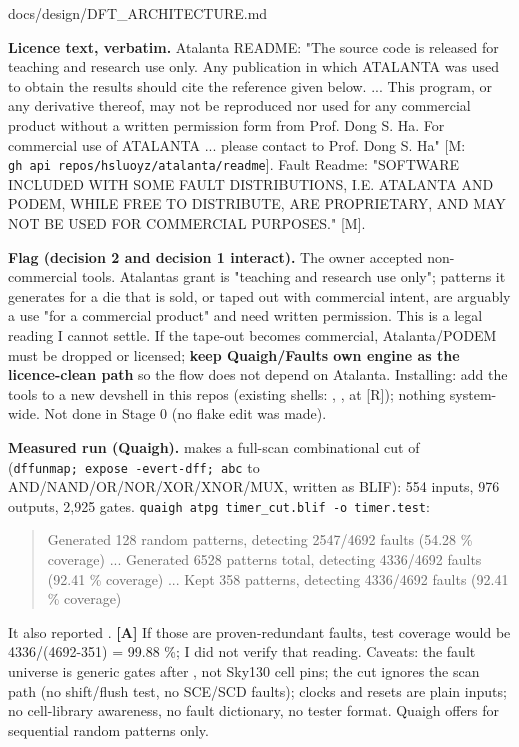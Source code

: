 \begin{relocated}{docs/design/DFT_ARCHITECTURE.md}
{}

\textbf{Licence text, verbatim.} Atalanta README: "The source code is
released for teaching and research use only. Any publication in which
ATALANTA was used to obtain the results should cite the reference given
below. ... This program, or any derivative thereof, may not be
reproduced nor used for any commercial product without a written
permission form from Prof. Dong S. Ha. For commercial use of ATALANTA
... please contact to Prof. Dong S. Ha" {[}M:
\texttt{gh\ api\ repos/\allowbreak{}hsluoyz/\allowbreak{}atalanta/\allowbreak{}readme}{]}.
Fault Readme: "SOFTWARE INCLUDED WITH SOME FAULT DISTRIBUTIONS, I.E.
ATALANTA AND PODEM, WHILE FREE TO DISTRIBUTE, ARE PROPRIETARY, AND MAY
NOT BE USED FOR COMMERCIAL PURPOSES." {[}M{]}.

\textbf{Flag (decision 2 and decision 1 interact).} The owner accepted
non-commercial tools. Atalanta\textquotesingle s grant is "teaching and
research use only"; patterns it generates for a die that is sold, or
taped out with commercial intent, are arguably a use "for a commercial
product" and need written permission. This is a legal reading I cannot
settle. If the tape-out becomes commercial, Atalanta/\allowbreak{}PODEM
must be dropped or licensed; \textbf{keep
Quaigh/\allowbreak{}Fault\textquotesingle s own engine as the
licence-clean path} so the flow does not depend on Atalanta. Installing:
add the tools to a new devshell in this repo\textquotesingle s
 (existing shells: , ,
 at  {[}R{]}); nothing
system-wide. Not done in Stage 0 (no flake edit was made).

\textbf{Measured run (Quaigh).}  makes a full-scan
combinational cut of 
(\texttt{dffunmap;\ expose\ -\allowbreak{}evert-\allowbreak{}dff;\ abc}
to
AND/\allowbreak{}NAND/\allowbreak{}OR/\allowbreak{}NOR/\allowbreak{}XOR/\allowbreak{}XNOR/\allowbreak{}MUX,
written as BLIF): 554 inputs, 976 outputs, 2,925 gates.
\texttt{quaigh\ atpg\ timer\_\allowbreak{}cut.\allowbreak{}blif\ -\allowbreak{}o\ timer.\allowbreak{}test}:

\begin{quote}
Generated 128 random patterns, detecting 2547/4692 faults (54.28 \%
coverage) ... Generated 6528 patterns total, detecting 4336/4692 faults
(92.41 \% coverage) ... Kept 358 patterns, detecting 4336/4692 faults
(92.41 \% coverage)
\end{quote}

It also reported . \textbf{{[}A{]}} If those are
proven-redundant faults, test coverage would be
4336/\allowbreak{}(4692-351) = 99.88 \%; I did not verify that reading.
Caveats: the fault universe is generic gates after , not
Sky130 cell pins; the cut ignores the scan path (no
shift/\allowbreak{}flush test, no SCE/SCD faults); clocks and resets are
plain inputs; no cell-library awareness, no fault dictionary, no tester
format. Quaigh offers  for sequential random patterns
only.


\end{relocated}
